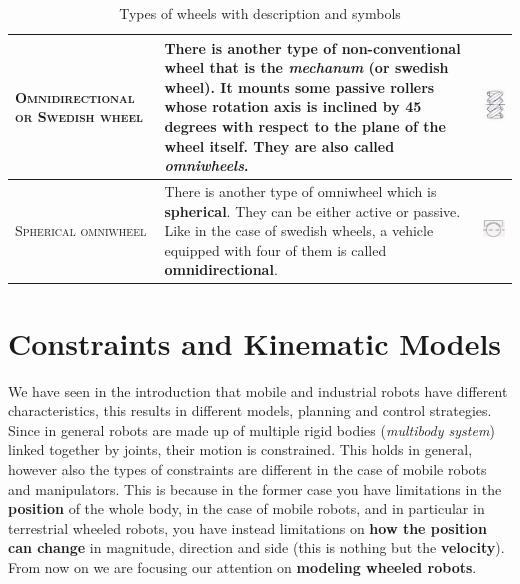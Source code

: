 \begin{table}
\begin{tabular}{m{5cm} m{9cm} m{2cm} }
        \midrule
        {\textsc{Omnidirectional or Swedish wheel}}&{There is another type of non-conventional wheel that is the \textit{mechanum} (or \textbf{swedish wheel}). It mounts some passive rollers whose rotation axis is inclined by 45 degrees with respect to the plane of the wheel itself. They are also called \textit{omniwheels}.}&
        {\includegraphics[scale=0.8]{img/swedish_wheel.png}} \\
        \midrule
        {\textsc{Spherical omniwheel}}&{There is another type of omniwheel which is \textbf{spherical}. They can be either active or passive. Like in the case of swedish wheels, a vehicle equipped with four of them is called \textbf{omnidirectional}.}& 
        {\includegraphics[scale=0.6]{img/spherical_wheel.png}}\\
    \end{tabular}
    \caption{Types of wheels with description and symbols}
    \label{tab:wheels}
\end{table}


\section{Constraints and Kinematic Models}
We have seen in the introduction that mobile and industrial robots have different characteristics, this results in different models, planning and control strategies. Since in general robots are made up of multiple rigid bodies (\textit{multibody system}) linked together by joints, their motion is constrained. This holds in general, however also the types of constraints are different in the case of mobile robots and manipulators. This is because in the former case you have limitations in the \textbf{position} of the whole body, in the case of mobile robots, and in particular in terrestrial wheeled robots, you have instead limitations on \textbf{how the position can change} in magnitude, direction and side (this is nothing but the \textbf{velocity}). From now on we are focusing our attention on \textbf{modeling wheeled robots}.


